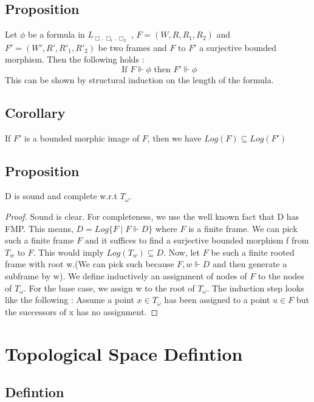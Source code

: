 \documentclass[12pt, a4paper]{scrreprt}
\begin{document}
\section {Proposition}
Let $\phi$ be a formula in $L_{\Box, \Box_1, \Box_2}$ , $F = (W, R, R_1, R_2)$ and $F' = (W', R', R'_1, R'_2)$ be two frames and $F \mbox{ to } F'$ a surjective bounded morphism. Then the following holds :
$$ \mbox{ If }F \Vdash \phi \mbox{ then } F' \Vdash \phi$$
This can be shown by structural induction on the length of the formula.

\section{Corollary}
If $F'$ is a bounded morphic image of $F$, then we have $Log(F) \subseteq Log(F')$

\section{Proposition}
D is sound and complete w.r.t $T_\omega$.

\begin{proof}
Sound is clear. For completeness, we use the well known fact that D has FMP. This means, $D = Log\{F \mid F \Vdash D\}$ where $F$ is a finite frame.
We can pick such a finite frame $F$ and it suffices to find a surjective bounded morphism f from $T_w$ to $F$. This would imply $Log(T_w) \subseteq D$. \newline
Now, let $F$ be such a finite rooted frame with root w.(We can pick such because $F,w \Vdash D$ and then generate a subframe by w). We define 
inductively an assignment of nodes of $F$ to the nodes of $T_\omega$. For the base case, we assign w to the root of $T_\omega$. The induction step looks like the following : 
Assume a point $x \in T_\omega$ has been assigned to a point $u \in F$ but the successors of x has no assignment. 

\end{proof}






\chapter{Topological Space Defintion}

\section{Defintion}
\end{document}
